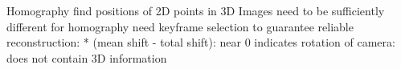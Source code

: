 \documentclass{beamer}
\begin{document}
\begin{frame}{Homography}
	find positions of 2D points in 3D
	Images need to be sufficiently different for homography
	need keyframe selection to guarantee reliable reconstruction:
	* (mean shift - total shift):
	  near 0 indicates rotation of camera: does not contain 3D information
\end{frame}





\end{document}
